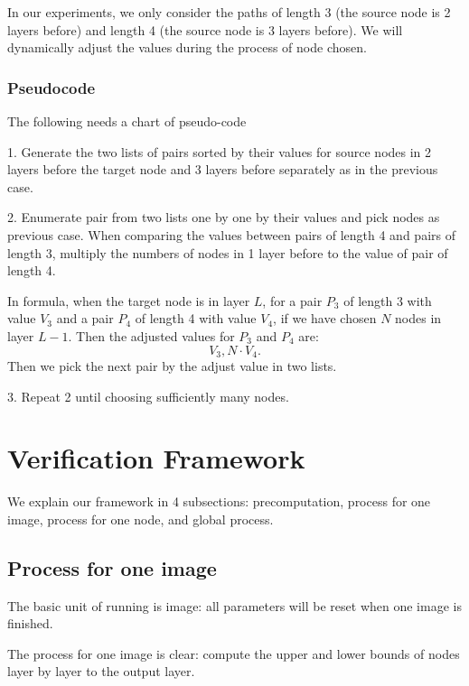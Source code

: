 \documentclass{llncs}
\begin{document}
In our experiments, we only consider the paths of length 3 (the source node is 2 layers before) and length 4 (the source node is 3 layers before). We will dynamically adjust the values during the process of node chosen.

\subsubsection*{Pseudocode}

The following needs a chart of pseudo-code

\vspace*{1ex}

1. Generate the two lists of pairs sorted by their values for source nodes in 2 layers before the target node and 3 layers before separately as in the previous case.

2. Enumerate pair from two lists one by one by their values and pick nodes as previous case. When comparing the values between pairs of length 4 and pairs of length 3, multiply the numbers of nodes in 1 layer before to the value of pair of length 4.

In formula, when the target node is in layer $L$, for a pair $P_3$ of length 3 with value $V_3$ and a pair $P_4$ of length 4 with value $V_4$, if we have chosen $N$ nodes in layer $L-1$. Then the adjusted values for $P_3$ and $P_4$ are: $$V_3, N\cdot V_4.$$ Then we pick the next pair by the adjust value in two lists.

3. Repeat 2 until choosing sufficiently many nodes.


\section{Verification Framework}




We explain our framework in 4 subsections: precomputation, process for one image, process for one node, and global process.

\subsection{Process for one image}

The basic unit of running is image: all parameters will be reset when one image is finished.

The process for one image is clear: compute the upper and lower bounds of nodes layer by layer to the output layer. 
\end{document}
